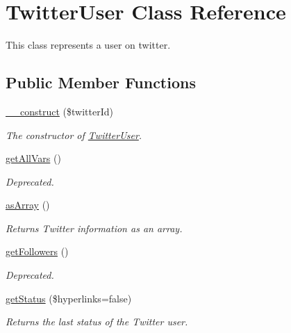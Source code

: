 \hypertarget{class_twitter_user}{
\section{TwitterUser Class Reference}
\label{class_twitter_user}
}
This class represents a user on twitter.  


\subsection*{Public Member Functions}
\begin{CompactItemize}
\item 
\hyperlink{class_twitter_user_ac09b350e318425625ba5766fdd28118}{\_\-\_\-construct} (\$twitterId)
\begin{CompactList}\small\item\em The constructor of \hyperlink{class_twitter_user}{TwitterUser}. \item\end{CompactList}\item 
\hyperlink{class_twitter_user_3f9ce8a4f4440b619615becf76b43895}{getAllVars} ()
\begin{CompactList}\small\item\em Deprecated. \item\end{CompactList}\item 
\hyperlink{class_twitter_user_0badd8e7ffdf4e7c30f4954d782efc21}{asArray} ()
\begin{CompactList}\small\item\em Returns Twitter information as an array. \item\end{CompactList}\item 
\hyperlink{class_twitter_user_c1171d93ebf6f48e8440b9e8575252df}{getFollowers} ()
\begin{CompactList}\small\item\em Deprecated. \item\end{CompactList}\item 
\hyperlink{class_twitter_user_c9d80058de5952727ecf7f58448d266b}{getStatus} (\$hyperlinks=false)
\begin{CompactList}\small\item\em Returns the last status of the Twitter user. \item\end{CompactList}\end{CompactItemize}
